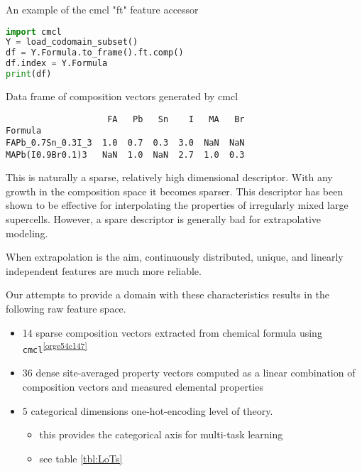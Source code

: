 \begin{ZZlisting}
  \caption{\label{lst:cmcl} An example of the cmcl "ft" feature accessor}
  \begin{CenteredBox}
    \begin{lstlisting}[language=python]
import cmcl
Y = load_codomain_subset()
df = Y.Formula.to_frame().ft.comp()
df.index = Y.Formula
print(df)
    \end{lstlisting}
  \end{CenteredBox}
\end{ZZlisting}

\begin{ZZlisting}
  \caption{\label{lst:cdf} Data frame of composition vectors generated by cmcl}
  \begin{CenteredBox}
    \begin{lstlisting}
                    FA   Pb   Sn    I   MA   Br
Formula                                        
FAPb_0.7Sn_0.3I_3  1.0  0.7  0.3  3.0  NaN  NaN
MAPb(I0.9Br0.1)3   NaN  1.0  NaN  2.7  1.0  0.3
    \end{lstlisting}
  \end{CenteredBox}
\end{ZZlisting}

This is naturally a sparse, relatively high dimensional descriptor.
With any growth in the composition space it becomes sparser.
This descriptor has been shown to be effective for interpolating the properties of irregularly mixed large supercells.
\autocite{mannodi-kanakkithodi-2022-data-driven}
However, a spare descriptor is generally bad for extrapolative modeling.
\autocite{ghiringhelli-2015-big-data} 

When extrapolation is the aim, continuously distributed, unique, and linearly independent features are much more reliable.
\autocite{lux-2020-inter-spars} 

Our attempts to provide a domain with these characteristics results in the following raw feature space.

\begin{itemize}
\item 14 sparse composition vectors extracted from chemical formula using \texttt{cmcl}\textsuperscript{\ref{orge54c147}}
\item 36 dense site-averaged property vectors computed as a linear combination of composition vectors and measured elemental properties \autocite{mentel-2014}
\item 5 categorical dimensions one-hot-encoding level of theory.
\begin{itemize}
\item this provides the categorical axis for multi-task learning
\item see table \ref{tbl:LoTs}
\end{itemize}
\end{itemize}

